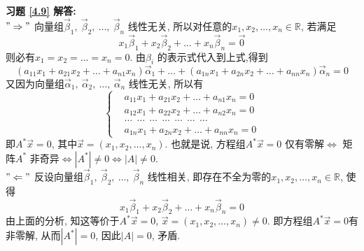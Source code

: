 \documentclass[a4paper]{book}
\begin{document}
\textbf{习题 \ref{4.9} 解答:}\\
$"\Rightarrow"$ 向量组$\vec{\beta}_1,\ \vec{\beta}_2,\ \dots,\ \vec{\beta}_n$ 线性无关, 所以对任意的$x_1,x_2,\dots,x_n\in \mathbb{R}$, 若满足
$$x_1\vec{\beta}_1+x_2\vec{\beta}_2+\dots+x_n\vec{\beta}_n=\vec{0}$$
则必有$x_1=x_2=\dots=x_n=0$. 由$\beta_i$ 的表示式代入到上式,得到
$$(a_{11}x_1+a_{21}x_2+\dots+a_{n1}x_n)\vec{\alpha}_1+\dots+(a_{1n}x_1+a_{2n}x_2+\dots+a_{nn}x_n)\vec{\alpha}_n=0$$
又因为向量组$\vec{\alpha}_1, \ \vec{\alpha}_2, \ \dots,\ \vec{\alpha}_n$ 线性无关, 所以有
\begin{displaymath}
\left\{\begin{aligned}
&a_{11}x_1+a_{21}x_2+\dots+a_{n1}x_n=0\\
&a_{12}x_1+a_{22}x_2+\dots+a_{n2}x_n=0\\
&\dots\ \ \dots\ \ \dots\ \ \dots\ \ \dots \ \ \dots \ \ \dots\\
&a_{1n}x_1+a_{2n}x_2+\dots+a_{nn}x_n=0
\end{aligned}
\right.
\end{displaymath}
即$A^{*}\vec{x}=0$, 其中$\vec{x}=(x_1,x_2,\dots,x_n)$. 也就是说, 方程组$A^{*}\vec{x}=0$ 仅有零解$\Leftrightarrow$ 矩阵$A^{*}$ 非奇异$\Leftrightarrow|A^{*}|\not=0\Leftrightarrow |A|\not=0$.\\
$"\Leftarrow"$ 反设向量组$\vec{\beta}_1,\ \vec{\beta}_2,\ \dots,\ \vec{\beta}_n$ 线性相关, 即存在不全为零的$x_1,x_2,\dots,x_n\in \mathbb{R}$, 使得
$$x_1\vec{\beta}_1+x_2\vec{\beta}_2+\dots+x_n\vec{\beta}_n=0$$
由上面的分析, 知这等价于$A^{*}\vec{x}=0$,  $\vec{x}=(x_1,x_2,\dots,x_n)\not=0$. 即方程组$A^{*}\vec{x}=0$有非零解, 从而$|A^{*}|=0$, 因此$|A|=0$, 矛盾.
\end{document}
